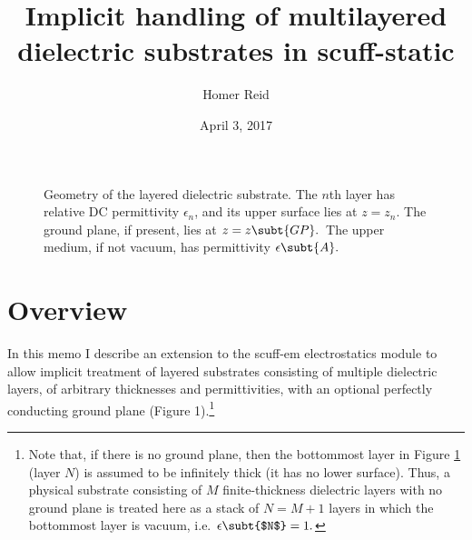 \documentclass[letterpaper]{article}
\title {Implicit handling of multilayered dielectric substrates 
        in {\sc scuff-static}
       }
\author {Homer Reid}
\date {April 3, 2017}
\begin{document}
\pagestyle{myheadings}
\maketitle

\tableofcontents

\newpage
\begin{figure}
\begin{center}
\caption{Geometry of the layered dielectric substrate. The $n$th layer
has relative DC permittivity $\epsilon_n$, and its upper surface
lies at $z=z_n$. The ground plane, if present, lies
at $z=z\subt{GP}.$ The upper medium, if not vacuum, has permittivity
$\epsilon\subt{A}.$}
\label{SubstrateGeometryFigure}
\end{center}
\end{figure}
\section{Overview}

In this memo I describe an extension to the {\sc scuff-em}
electrostatics module to allow implicit treatment of
layered substrates consisting of multiple dielectric layers,
of arbitrary thicknesses and permittivities, with an optional
perfectly conducting ground plane (Figure 1).\footnote{Note 
that, if there is no ground plane, then the bottommost 
layer in Figure \ref{SubstrateGeometryFigure}
(layer $N$) is assumed
to be infinitely thick (it has no lower surface). Thus, a physical 
substrate consisting of $M$ finite-thickness dielectric layers with 
no ground plane is treated here as a stack of $N=M+1$ layers in which
the bottommost layer is vacuum, i.e. $\epsilon\subt{$N$}=1.$}
\end{document}
